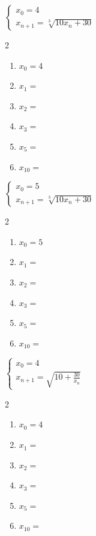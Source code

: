 \documentclass[main.tex]{subfiles}
\begin{document}
\noindent
\parbox{0.24\linewidth}{
$\begin{cases}
	x_0=4  \\ 
	x_{n+1}=\sqrt[3]{10x_n+30}
\end{cases}$  
\begin{spacing}{2}
	\begin{enumerate}[leftmargin=*, label={},]
		\item $x_0=4$
		\item $x_1= $
		\item $x_2= $
		\item $x_3= $
		\item $x_5= $ 
		\item $x_{10}= $
	\end{enumerate}
\end{spacing} 
}
\parbox{0.24\linewidth}{
$\begin{cases}
	x_0=5  \\ 
	x_{n+1}=\sqrt[3]{10x_n+30}
\end{cases}$  
\begin{spacing}{2}
	\begin{enumerate}[leftmargin=*, label={},]
		\item $x_0=5$
		\item $x_1= $
		\item $x_2= $
		\item $x_3= $
		\item $x_5= $ 
		\item $x_{10}= $
	\end{enumerate}
\end{spacing} 
}
\parbox{0.24\linewidth}{
	$\begin{cases}
		x_0=4  \\ 
		x_{n+1}=\sqrt{10+\frac{30}{x_n}}
	\end{cases}$  
	\begin{spacing}{2}
		\begin{enumerate}[leftmargin=*, label={},]
			\item $x_0=4$
			\item $x_1= $
			\item $x_2= $
			\item $x_3= $
			\item $x_5= $ 
			\item $x_{10}= $
		\end{enumerate}
	\end{spacing} 
}
\end{document}
